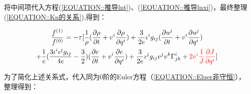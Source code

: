 \documentclass[LBMDerivation.tex]{subfiles}
\begin{document}
将中间项代入方程(\ref{EQUATION::推导lnt})、(\ref{EQUATION::推导lnxi})，最终整理(\ref{EQUATION::Kn的关系}),得到：






\begin{equation}
  \begin{gathered}
    \frac{f^{(1)}}{f^{(0)}}=
    -\tau [\frac{1}{\rho}(\frac{\partial \rho}{\partial t} + v^{i}\frac{\partial \rho}{\partial q^i}) + \frac{3}{2e}\iota^i g_{ij} (\frac{\partial u^j}{\partial t}+ v^i \frac{\partial u^j}{\partial q^i}) \\
    + \frac{1}{e} (\frac{3 {\iota^i\iota^jg_{ij}}}{4e}-\frac{3}{2}) (\frac{\partial e}{\partial t} + v^i \frac{\partial e}{\partial q^i}) + \frac{3}{2e}\iota^j g_{ij} v^{j} v^{k} \Gamma_{j k}^{i}   + {\color{red} 2v^i  \frac{1}{J}\frac{\partial J}{\partial q^i} }]
  \end{gathered}
\end{equation}




为了简化上述关系式，代入同为0阶的Euler方程（\ref{EQUATION::Eluer非守恒}），整理得到：
\end{document}
